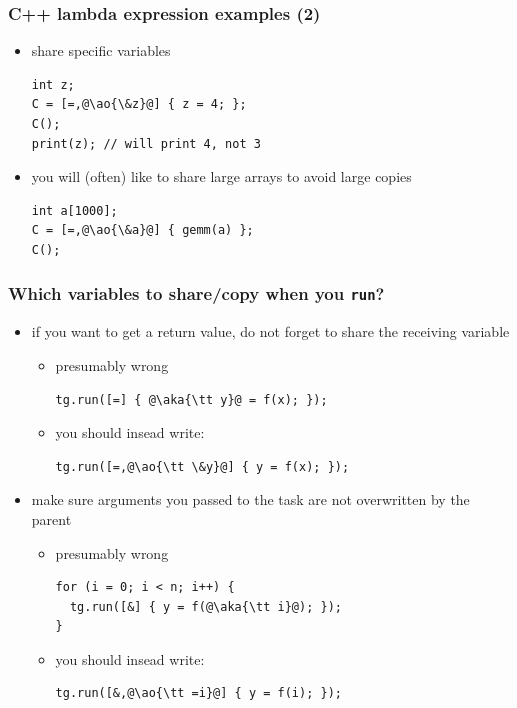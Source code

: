 \documentclass[12pt,dvipdfmx]{beamer}
\newcommand{\ao}[1]{{\color{blue}#1}}
\newcommand{\aka}[1]{{\color{red}#1}}
\begin{document}
\begin{frame}[fragile]
\frametitle{C++ lambda expression examples (2)}
\begin{itemize}
\item share specific variables
\begin{lstlisting}
int z;
C = [=,@\ao{\&z}@] { z = 4; };
C();
print(z); // will print 4, not 3
\end{lstlisting}

\item you will (often) 
  like to share large arrays to avoid large copies
\begin{lstlisting}
int a[1000];
C = [=,@\ao{\&a}@] { gemm(a) };
C();
\end{lstlisting}
\end{itemize}
\end{frame}

\begin{frame}[fragile]
\frametitle{Which variables to share/copy when you {\tt run}?}
\begin{itemize}
\item if you want to get a return value, 
  do not forget to share the receiving variable 
  \begin{itemize}
  \item presumably wrong
\begin{lstlisting}
tg.run([=] { @\aka{\tt y}@ = f(x); });
\end{lstlisting}
  \item you should insead write:
\begin{lstlisting}
tg.run([=,@\ao{\tt \&y}@] { y = f(x); });
\end{lstlisting}
  \end{itemize}

\item make sure arguments you passed to the task 
  are not overwritten by the parent
  \begin{itemize}
  \item presumably wrong
\begin{lstlisting}
for (i = 0; i < n; i++) {
  tg.run([&] { y = f(@\aka{\tt i}@); });
}
\end{lstlisting}
  \item you should insead write:
\begin{lstlisting}
tg.run([&,@\ao{\tt =i}@] { y = f(i); });
\end{lstlisting}
  \end{itemize}
\end{itemize}
\end{frame}
\fi
\end{document}
